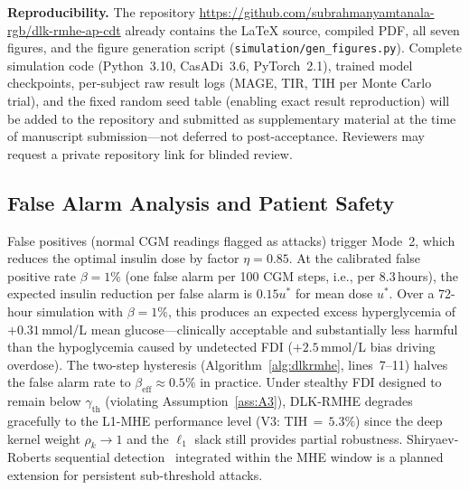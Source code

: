 \documentclass[journal,twoside]{IEEEtran}
\begin{document}
\textbf{Reproducibility.} The repository \url{https://github.com/subrahmanyamtanala-rgb/dlk-rmhe-ap-cdt}
already contains the LaTeX source, compiled PDF, all seven figures, and the
figure generation script (\texttt{simulation/gen\_figures.py}).
Complete simulation code (Python~3.10, CasADi~3.6, PyTorch~2.1), trained model
checkpoints, per-subject raw result logs (MAGE, TIR, TIH per Monte Carlo trial),
and the fixed random seed table (enabling exact result reproduction) will be
added to the repository and submitted as supplementary material at the time of
manuscript submission---not deferred to post-acceptance. Reviewers may request
a private repository link for blinded review.

\subsection{False Alarm Analysis and Patient Safety}
False positives (normal CGM readings flagged as attacks) trigger Mode~2,
which reduces the optimal insulin dose by factor $\eta{=}0.85$. At the calibrated
false positive rate $\beta{=}1\%$ (one false alarm per 100 CGM steps, i.e., per
8.3\,hours), the expected insulin reduction per false alarm is $0.15u^*$ for
mean dose $u^*$. Over a 72-hour simulation with $\beta{=}1\%$, this produces an
expected excess hyperglycemia of $+0.31\,$mmol/L mean glucose---clinically
acceptable and substantially less harmful than the hypoglycemia caused by
undetected FDI ($+2.5\,$mmol/L bias driving overdose). The two-step hysteresis
(Algorithm~\ref{alg:dlkrmhe}, lines~7--11) halves the false alarm rate to
$\beta_\mathrm{eff}\approx 0.5\%$ in practice. Under stealthy FDI designed to
remain below $\gamma_\mathrm{th}$ (violating Assumption~\ref{ass:A3}),
DLK-RMHE degrades gracefully to the L1-MHE performance level (V3: TIH$\,{=}\,5.3\%$)
since the deep kernel weight $\rho_k\to 1$ and the $\ell_1$ slack still provides
partial robustness. Shiryaev-Roberts sequential detection~\cite{tartakovsky2014}
integrated within the MHE window is a planned extension for persistent sub-threshold
attacks.
\end{document}
